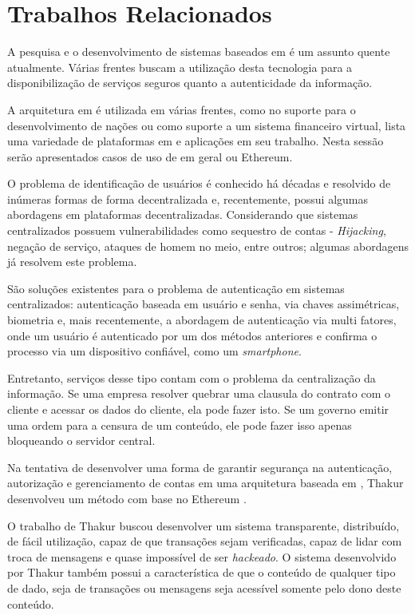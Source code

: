 \documentclass[tcc,capa]{texufpel}
\begin{document}

\chapter{Trabalhos Relacionados}\label{ssc:trabalhos-relacionados}
    
    A pesquisa e o desenvolvimento de sistemas baseados em \bchain é um assunto quente atualmente. Várias frentes buscam a utilização desta tecnologia para a disponibilização de serviços seguros quanto a autenticidade da informação.
    
    A arquitetura em \bchain é utilizada em várias frentes, como no suporte para o desenvolvimento de nações ou como suporte a um sistema financeiro virtual, \cite{gomez2017creating} lista uma variedade de plataformas em \bchain e aplicações em seu trabalho. Nesta sessão serão apresentados casos de uso de \bchain em geral ou Ethereum.
    
    O problema de identificação de usuários é conhecido há décadas e resolvido de inúmeras formas de forma decentralizada e, recentemente, possui algumas abordagens em plataformas decentralizadas. Considerando que sistemas centralizados possuem vulnerabilidades como sequestro de contas - \textit{Hijacking}, negação de serviço, ataques de homem no meio, entre outros; algumas abordagens já resolvem este problema.
    
    São soluções existentes para o problema de autenticação em sistemas centralizados: autenticação baseada em usuário e senha, via chaves assimétricas, biometria e, mais recentemente, a abordagem de autenticação via multi fatores, onde um usuário é autenticado por um dos métodos anteriores e confirma o processo via um dispositivo confiável, como um \textit{smartphone}.
    
    Entretanto, serviços desse tipo contam com o problema da centralização da informação. Se uma empresa resolver quebrar uma clausula do contrato com o cliente e acessar os dados do cliente, ela pode fazer isto. Se um governo emitir uma ordem para a censura de um conteúdo, ele pode fazer isso apenas bloqueando o servidor central.
    
    Na tentativa de desenvolver uma forma de garantir segurança na autenticação, autorização e gerenciamento de contas em uma arquitetura baseada em \bchain, Thakur desenvolveu um método com base no Ethereum \cite{thakur2017authentication}.
    
    O trabalho de Thakur buscou desenvolver um sistema transparente, distribuído, de fácil utilização, capaz de que transações sejam verificadas, capaz de lidar com troca de mensagens e quase impossível de ser \textit{hackeado}. O sistema desenvolvido por Thakur também possui a característica de que o conteúdo de qualquer tipo de dado, seja de transações ou mensagens seja acessível somente pelo dono deste conteúdo.
    
\end{document}

